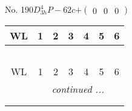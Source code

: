 \documentclass[fleqn,9pt,landscape]{jsarticle}
\begin{document}
\newpage
No. 190\quad$D_{3h}^{4}$\quad$P-62c$\quad[ hexagonal ]\quad$+\begin{pmatrix} 0 & 0 & 0 \end{pmatrix}$
\begin{center}
\renewcommand{\arraystretch}{1.2}
\begin{longtable}{ccccccc}
 \hline \hline
WL & 1 & 2 & 3 & 4 & 5 & 6 \\ \hline \endfirsthead

\multicolumn{6}{l}{\tablename\ \thetable{}} \\
 \hline \hline
WL & 1 & 2 & 3 & 4 & 5 & 6 \\ \hline \endhead

 \hline \hline
\multicolumn{6}{r}{\footnotesize\it continued ...} \\ \endfoot

 \hline \hline
\multicolumn{6}{r}{} \\ \endlastfoot


\end{longtable}
\end{center}
\end{document}
